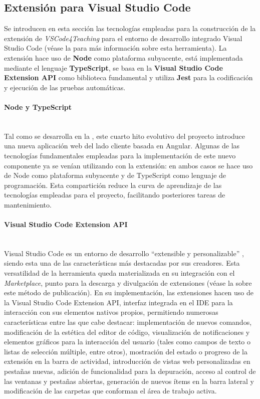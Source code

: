 \subsection{Extensión para Visual Studio Code}
\label{subsec:tecExtension}
Se introducen en esta sección las tecnologías empleadas para la construcción de la extensión de \textit{VSCode4Teaching} para el entorno de desarrollo integrado Visual Studio Code (véase la  para más información sobre esta herramienta). La extensión hace uso de \textbf{Node} como plataforma subyacente, está implementada mediante el lenguaje \textbf{TypeScript}, se basa en la \textbf{Visual Studio Code Extension API} como biblioteca fundamental y utiliza \textbf{Jest} para la codificación y ejecución de las pruebas automáticas.

\paragraph{Node y TypeScript}\mbox{} \\
Tal como se desarrolla en la , este cuarto hito evolutivo del proyecto introduce una nueva aplicación web del lado cliente basada en Angular. Algunas de las tecnologías fundamentales empleadas para la implementación de este nuevo componente ya se venían utilizando con la extensión: en ambos casos se hace uso de Node como plataforma subyacente y de TypeScript como lenguaje de programación. Esta compartición reduce la curva de aprendizaje de las tecnologías empleadas para el proyecto, facilitando posteriores tareas de mantenimiento.

\paragraph{Visual Studio Code Extension API}\mbox{} \\
Visual Studio Code es un entorno de desarrollo ``extensible y personalizable'' \cite{VSCode}, siendo esta una de las características más destacadas por sus creadores. Esta versatilidad de la herramienta queda materializada en su integración con el \textit{Marketplace}, punto para la descarga y divulgación de extensiones (véase la  sobre este método de publicación). En su implementación, las extensiones hacen uso de la Visual Studio Code Extension API, interfaz integrada en el IDE para la interacción con sus elementos nativos propios, permitiendo numerosas características entre las que cabe destacar: implementación de nuevos comandos, modificación de la estética del editor de código, visualización de notificaciones y elementos gráficos para la interacción del usuario (tales como campos de texto o listas de selección múltiple, entre otros), mostración del estado o progreso de la extensión en la barra de actividad, introducción de vistas web personalizadas en pestañas nuevas, adición de funcionalidad para la depuración, acceso al control de las ventanas y pestañas abiertas, generación de nuevos ítems en la barra lateral y modificación de las carpetas que conforman el área de trabajo activa.


